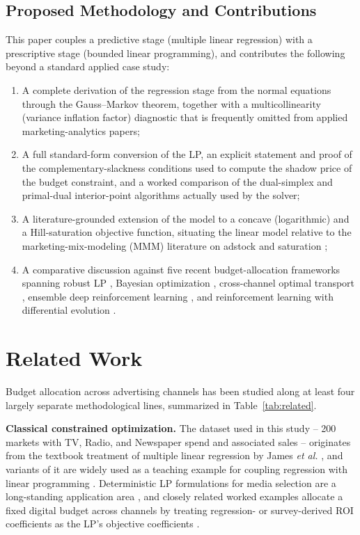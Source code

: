 \documentclass[conference]{IEEEtran}
\begin{document}
\subsection{Proposed Methodology and Contributions}
This paper couples a predictive stage (multiple linear regression) with a prescriptive stage (bounded linear programming), and contributes the following beyond a standard applied case study:
\begin{enumerate}
\item A complete derivation of the regression stage from the normal equations through the Gauss--Markov theorem, together with a multicollinearity (variance inflation factor) diagnostic that is frequently omitted from applied marketing-analytics papers;
\item A full standard-form conversion of the LP, an explicit statement and proof of the complementary-slackness conditions used to compute the shadow price of the budget constraint, and a worked comparison of the dual-simplex and primal-dual interior-point algorithms actually used by the solver;
\item A literature-grounded extension of the model to a concave (logarithmic) and a Hill-saturation objective function, situating the linear model relative to the marketing-mix-modeling (MMM) literature on adstock and saturation \cite{mmm_diminishing_returns,mmm_saturation_curves,mmm_hill_pymc};
\item A comparative discussion against five recent budget-allocation frameworks spanning robust LP \cite{robust_lp_2025}, Bayesian optimization \cite{bora_2022}, cross-channel optimal transport \cite{adcob_2023}, ensemble deep reinforcement learning \cite{danaei_2026}, and reinforcement learning with differential evolution \cite{li_ieee_access_2024}.
\end{enumerate}

\section{Related Work}
\label{sec:related}

Budget allocation across advertising channels has been studied along at least four largely separate methodological lines, summarized in Table~\ref{tab:related}.

\textbf{Classical constrained optimization.} The dataset used in this study -- 200 markets with TV, Radio, and Newspaper spend and associated sales -- originates from the textbook treatment of multiple linear regression by James \emph{et al.} \cite{islr_2013}, and variants of it are widely used as a teaching example for coupling regression with linear programming \cite{krasi_github}. Deterministic LP formulations for media selection are a long-standing application area \cite{study_lp_media}, and closely related worked examples allocate a fixed digital budget across channels by treating regression- or survey-derived ROI coefficients as the LP's objective coefficients \cite{yang_medium_2024,xpon_lp_2026}.
\end{document}
